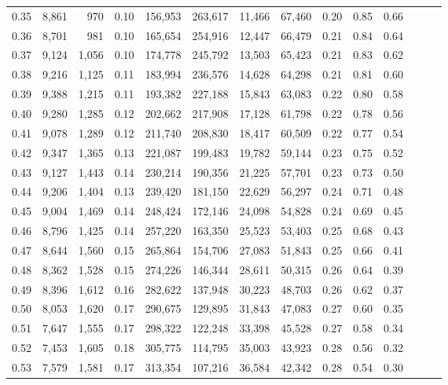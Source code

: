 \begin{tabular}{rrrrrrrrrrrrrr}
0.35 &  8,861 &    970 &  0.10 &  156,953 &  263,617 &  11,466 &  67,460 &  0.20 &  0.85 &      0.66 \\
0.36 &  8,701 &    981 &  0.10 &  165,654 &  254,916 &  12,447 &  66,479 &  0.21 &  0.84 &      0.64 \\
0.37 &  9,124 &  1,056 &  0.10 &  174,778 &  245,792 &  13,503 &  65,423 &  0.21 &  0.83 &      0.62 \\
0.38 &  9,216 &  1,125 &  0.11 &  183,994 &  236,576 &  14,628 &  64,298 &  0.21 &  0.81 &      0.60 \\
0.39 &  9,388 &  1,215 &  0.11 &  193,382 &  227,188 &  15,843 &  63,083 &  0.22 &  0.80 &      0.58 \\
0.40 &  9,280 &  1,285 &  0.12 &  202,662 &  217,908 &  17,128 &  61,798 &  0.22 &  0.78 &      0.56 \\
0.41 &  9,078 &  1,289 &  0.12 &  211,740 &  208,830 &  18,417 &  60,509 &  0.22 &  0.77 &      0.54 \\
0.42 &  9,347 &  1,365 &  0.13 &  221,087 &  199,483 &  19,782 &  59,144 &  0.23 &  0.75 &      0.52 \\
0.43 &  9,127 &  1,443 &  0.14 &  230,214 &  190,356 &  21,225 &  57,701 &  0.23 &  0.73 &      0.50 \\
0.44 &  9,206 &  1,404 &  0.13 &  239,420 &  181,150 &  22,629 &  56,297 &  0.24 &  0.71 &      0.48 \\
0.45 &  9,004 &  1,469 &  0.14 &  248,424 &  172,146 &  24,098 &  54,828 &  0.24 &  0.69 &      0.45 \\
0.46 &  8,796 &  1,425 &  0.14 &  257,220 &  163,350 &  25,523 &  53,403 &  0.25 &  0.68 &      0.43 \\
0.47 &  8,644 &  1,560 &  0.15 &  265,864 &  154,706 &  27,083 &  51,843 &  0.25 &  0.66 &      0.41 \\
0.48 &  8,362 &  1,528 &  0.15 &  274,226 &  146,344 &  28,611 &  50,315 &  0.26 &  0.64 &      0.39 \\
0.49 &  8,396 &  1,612 &  0.16 &  282,622 &  137,948 &  30,223 &  48,703 &  0.26 &  0.62 &      0.37 \\
0.50 &  8,053 &  1,620 &  0.17 &  290,675 &  129,895 &  31,843 &  47,083 &  0.27 &  0.60 &      0.35 \\
0.51 &  7,647 &  1,555 &  0.17 &  298,322 &  122,248 &  33,398 &  45,528 &  0.27 &  0.58 &      0.34 \\
0.52 &  7,453 &  1,605 &  0.18 &  305,775 &  114,795 &  35,003 &  43,923 &  0.28 &  0.56 &      0.32 \\
0.53 &  7,579 &  1,581 &  0.17 &  313,354 &  107,216 &  36,584 &  42,342 &  0.28 &  0.54 &      0.30 \\

\end{tabular}
